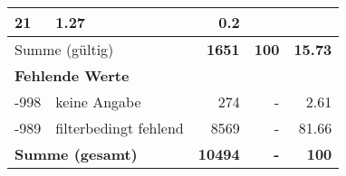 \begin{longtable}{lXrrr}
       \num{21} &
       \num[round-mode=places,round-precision=2]{1,27} &
         \num[round-mode=places,round-precision=2]{0,2} \\
     \midrule
     \multicolumn{2}{l}{Summe (gültig)} &
       \textbf{\num{1651}} &
     \textbf{100} &
       \textbf{\num[round-mode=places,round-precision=2]{15,73}} \\
     \multicolumn{5}{l}{\textbf{Fehlende Werte}}\\
       -998 &
       keine Angabe &
         \num{274} &
        - &
         \num[round-mode=places,round-precision=2]{2,61} \\
       -989 &
       filterbedingt fehlend &
         \num{8569} &
        - &
         \num[round-mode=places,round-precision=2]{81,66} \\
     \midrule
     \multicolumn{2}{l}{\textbf{Summe (gesamt)}} &
          \textbf{\num{10494}} &
        \textbf{-} &
        \textbf{100} \\
     \bottomrule
     \end{longtable}
     
